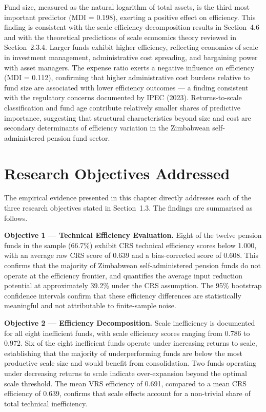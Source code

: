 \documentclass[12pt,a4paper]{article}
\begin{document}
Fund size, measured as the natural logarithm of total assets, is the third most important predictor (MDI = 0.198), exerting a positive effect on efficiency. This finding is consistent with the scale efficiency decomposition results in Section~4.6 and with the theoretical predictions of scale economics theory reviewed in Section~2.3.4. Larger funds exhibit higher efficiency, reflecting economies of scale in investment management, administrative cost spreading, and bargaining power with asset managers. The expense ratio exerts a negative influence on efficiency (MDI = 0.112), confirming that higher administrative cost burdens relative to fund size are associated with lower efficiency outcomes --- a finding consistent with the regulatory concerns documented by IPEC (2023). Returns-to-scale classification and fund age contribute relatively smaller shares of predictive importance, suggesting that structural characteristics beyond size and cost are secondary determinants of efficiency variation in the Zimbabwean self-administered pension fund sector.

\section{Research Objectives Addressed}

The empirical evidence presented in this chapter directly addresses each of the three research objectives stated in Section~1.3. The findings are summarised as follows.

\textbf{Objective 1 --- Technical Efficiency Evaluation.} Eight of the twelve pension funds in the sample (66.7\%) exhibit CRS technical efficiency scores below 1.000, with an average raw CRS score of 0.639 and a bias-corrected score of 0.608. This confirms that the majority of Zimbabwean self-administered pension funds do not operate at the efficiency frontier, and quantifies the average input reduction potential at approximately 39.2\% under the CRS assumption. The 95\% bootstrap confidence intervals confirm that these efficiency differences are statistically meaningful and not attributable to finite-sample noise.

\textbf{Objective 2 --- Efficiency Decomposition.} Scale inefficiency is documented for all eight inefficient funds, with scale efficiency scores ranging from 0.786 to 0.972. Six of the eight inefficient funds operate under increasing returns to scale, establishing that the majority of underperforming funds are below the most productive scale size and would benefit from consolidation. Two funds operating under decreasing returns to scale indicate over-expansion beyond the optimal scale threshold. The mean VRS efficiency of 0.691, compared to a mean CRS efficiency of 0.639, confirms that scale effects account for a non-trivial share of total technical inefficiency.
\end{document}
